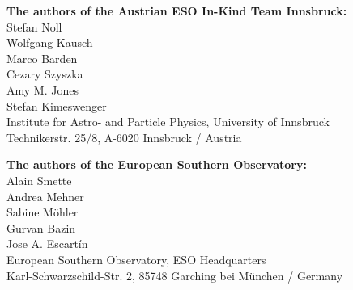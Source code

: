 \documentclass[a4paper,twoside,11pt]{article}
\begin{document}
\begin{center}
\textbf{The authors of the Austrian ESO In-Kind Team Innsbruck:} \\
    Stefan Noll \\
    Wolfgang Kausch \\
    Marco Barden \\
    Cezary Szyszka \\
    Amy M. Jones \\
    Stefan Kimeswenger \\
    Institute for Astro- and Particle Physics, University of Innsbruck \\
    Technikerstr. 25/8, A-6020 Innsbruck / Austria \\
\end{center}
\begin{center}
\textbf{The authors of the European Southern Observatory:} \\
    Alain Smette \\
    Andrea Mehner \\
    Sabine M\"ohler \\
    Gurvan Bazin \\
    Jose A. Escart\'in \\
    European Southern Observatory, ESO Headquarters \\
    Karl-Schwarzschild-Str. 2, 85748 Garching bei M\"unchen / Germany \\
\end{center}


\cleardoublepage
\tableofcontents
\cleardoublepage

\cleardoublepage

\cleardoublepage

\cleardoublepage

\cleardoublepage

\cleardoublepage

\cleardoublepage

\cleardoublepage

\end{document}
